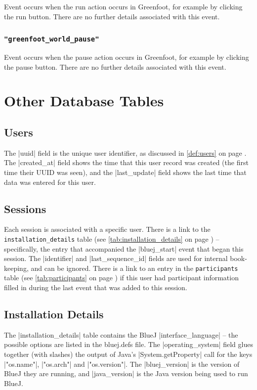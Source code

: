 \documentclass{report}
\newcommand{\myref}[1]{\autoref{#1} on page \pageref*{#1}}
\newcommand{\tabref}[1]{\lstinline|#1| table (see \myref{tab:#1})}
\newcommand{\intern}{This table may be interned, see \myref{def:intern}.}
\begin{document}
Event occurs when the run action occurs in Greenfoot, for example
by clicking the run button.
There are no further details associated with this event.

\subsection{\lstinline!"greenfoot_world_pause"!}

Event occurs when the pause action occurs in Greenfoot, for example
by clicking the pause button.
There are no further details associated with this event.

\chapter{Other Database Tables}
\label{sec:other_tables}

\section{Users}


The |uuid| field is the unique user identifier, as discussed in \myref{def:users}.
The |created_at| field shows the time that this user record was
created (the first time their UUID was seen), and the |last_update| field shows the last time that data was entered for
this user.

\section{Sessions}


Each session is associated with a specific user.  There is a link to
the \tabref{installation_details} -- specifically, the entry that
accompanied the |bluej_start| event that began this session.  The
|identifier| and |last_sequence_id| fields are used for internal
book-keeping, and can be ignored.  There is a link to an entry in the
\tabref{participants} if this user had participant information filled in
during the last event that was added to this session.

\section{Installation Details}


The |installation_details| table contains the BlueJ |interface_language| -- the
possible options are listed in the bluej.defs file.  The |operating_system|
field glues together (with slashes) the output of Java's |System.getProperty|
call for the keys |"os.name"|, |"os.arch"| and |"os.version"|.  The
|bluej_version| is the version of BlueJ they are running, and |java_version|
is the Java version being used to run BlueJ.
\end{document}
